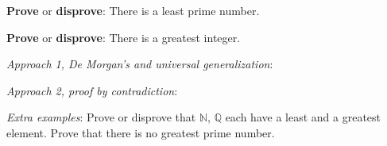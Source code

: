 
{\bf Prove} or {\bf  disprove}:  There is a least prime number.


\vfill





{\bf Prove} or {\bf  disprove}: There is a greatest integer. 

{\it Approach 1, De Morgan's and universal generalization}: 

\vfill

{\it Approach 2, proof by contradiction}: 

\vfill

\vfill

{\it Extra examples}: Prove or disprove that $\mathbb{N}$,  $\mathbb{Q}$ each have a
least and a greatest element. Prove that there is no greatest prime number.
